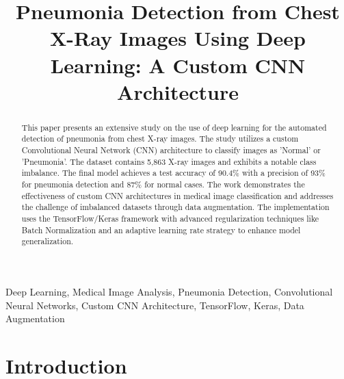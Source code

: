 \documentclass[conference]{IEEEtran}
\begin{document}
\title{Pneumonia Detection from Chest X-Ray Images Using Deep Learning: A Custom CNN Architecture}

\author{
}

\maketitle

\begin{abstract}
This paper presents an extensive study on the use of deep learning for the automated detection of pneumonia from chest X-ray images. The study utilizes a custom Convolutional Neural Network (CNN) architecture to classify images as 'Normal' or 'Pneumonia'. The dataset contains 5,863 X-ray images and exhibits a notable class imbalance. The final model achieves a test accuracy of 90.4\% with a precision of 93\% for pneumonia detection and 87\% for normal cases. The work demonstrates the effectiveness of custom CNN architectures in medical image classification and addresses the challenge of imbalanced datasets through data augmentation. The implementation uses the TensorFlow/Keras framework with advanced regularization techniques like Batch Normalization and an adaptive learning rate strategy to enhance model generalization.
\end{abstract}

\begin{IEEEkeywords}
Deep Learning, Medical Image Analysis, Pneumonia Detection, Convolutional Neural Networks, Custom CNN Architecture, TensorFlow, Keras, Data Augmentation
\end{IEEEkeywords}

\section{Introduction}
\end{document}
